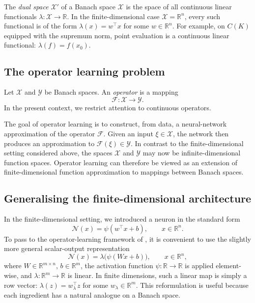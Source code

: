 The \emph{dual space} $\mathcal{X}'$ of a Banach space $\mathcal{X}$ is the space of all continuous linear functionals $\lambda : \mathcal{X} \to \mathbb{R}$. In the finite-dimensional case $\mathcal{X} = \mathbb{R}^n$, every such functional is of the form $\lambda(x) = w^\top x$ for some $w \in \mathbb{R}^n$. For example, on $C(K)$ equipped with the supremum norm, point evaluation is a continuous linear functional: $\lambda(f) = f(x_0)$.

\subsection{The operator learning problem}

Let $\mathcal{X}$ and $\mathcal{Y}$ be Banach spaces. An \emph{operator} is a mapping
\begin{equation}
    \mathcal{F} : \mathcal{X} \to \mathcal{Y}.
\label{eq:operator}
\end{equation}
In the present context, we restrict attention to continuous operators.

The goal of operator learning is to construct, from data, a neural-network approximation of the operator $\mathcal{F}$. Given an input $\xi \in \mathcal{X}$, the network then produces an approximation to $\mathcal{F}(\xi) \in \mathcal{Y}$. In contrast to the finite-dimensional setting considered above, the spaces $\mathcal{X}$ and $\mathcal{Y}$ may now be infinite-dimensional function spaces. Operator learning can therefore be viewed as an extension of finite-dimensional function approximation to mappings between Banach spaces.

\subsection{Generalising the finite-dimensional architecture}
\label{sec:generalising_architecture}

In the finite-dimensional setting, we introduced a neuron in the
standard form
\[
    \mathcal{N}(x) = \psi(w^\top x + b),
    \qquad x \in \mathbb{R}^n.
\]
To pass to the operator-learning framework of \citet{Benth2024},
it is convenient to use the slightly more general scalar-output
representation
\begin{equation}
    \mathcal{N}(x)
    = \lambda\bigl(\psi(Wx + b)\bigr),
    \qquad x \in \mathbb{R}^n,
\label{eq:finite_neuron_op}
\end{equation}
where $W \in \mathbb{R}^{m \times n}$, $b \in \mathbb{R}^m$,
the activation function $\psi : \mathbb{R} \to \mathbb{R}$ is
applied element-wise, and
$\lambda : \mathbb{R}^m \to \mathbb{R}$ is linear. In finite
dimensions, such a linear map is simply a row vector:
$\lambda(z) = w_\lambda^\top z$ for some $w_\lambda \in \mathbb{R}^m$.
This reformulation is useful because each ingredient has a natural
analogue on a Banach space.

